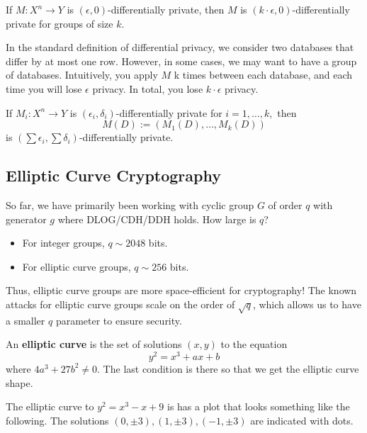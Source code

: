 \begin{theorem}
    If $M: X^n \to Y$ is $(\epsilon, 0)$-differentially private, then $M$ is $(k\cdot \epsilon, 0)$-differentially private for groups of size $k$.

    In the standard definition of differential privacy, we consider two databases that differ by at most one row. However, in some cases, we may want to have a group of databases. Intuitively, you apply $M$ k times between each database, and each time you will lose $\epsilon$ privacy. In total, you lose $k \cdot \epsilon$ privacy.
\end{theorem}

\begin{theorem}[Composition]
    If $M_i: X^n \to Y$ is $(\epsilon_i, \delta_i)$-differentially private for $i = 1, \dots, k,$ then
    $$M(D) := (M_1(D), \dots, M_k(D))$$
    is $(\sum \epsilon_i, \sum \delta_i)$-differentially private.
\end{theorem}

\subsection{Elliptic Curve Cryptography}

So far, we have primarily been working with cyclic group $G$ of order $q$ with generator $g$ where DLOG/CDH/DDH holds. How large is $q$?
\begin{itemize}
    \item For integer groups, $q \sim 2048$ bits.
    \item For elliptic curve groups, $q \sim 256$ bits.
\end{itemize}
Thus, elliptic curve groups are more space-efficient for cryptography! The known attacks for elliptic curve groups scale on the order of $\sqrt{q}$, which allows us to have a smaller $q$ parameter to ensure security.

\begin{definition}
    An \textbf{elliptic curve} is the set of solutions $(x,y)$ to the equation
    $$y^2 = x^3 + ax + b$$
    where $4a^3 + 27b^2 \neq 0$. The last condition is there so that we get the elliptic curve shape.
\end{definition}

\begin{example}
    The elliptic curve to $y^2 = x^3 - x + 9$ is has a plot that looks something like the following. The solutions $(0, \pm 3), (1, \pm 3), (-1, \pm 3)$ are indicated with dots.

    \begin{center}
    \footnotesize
    \def\svgwidth{0.35\linewidth}
    
    \end{center}
\end{example}

